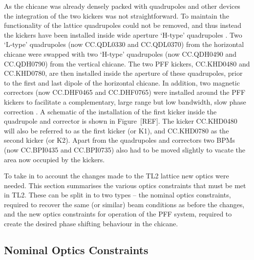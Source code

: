 As the chicane was already densely packed with quadrupoles and other devices the integration of the two kickers was not straightforward. To maintain the functionality of the lattice quadrupoles could not be removed, and thus instead the kickers have been installed inside wide aperture `H-type' quadrupoles \cite{tl2Magnets}. Two `L-type'  quadrupoles \cite{tl2Magnets} (now CC.QDL0330 and CC.QDL0370) from the horizontal chicane were swapped with two `H-type' quadrupoles (now CC.QDH0490 and CC.QDH0790) from the vertical chicane. The two PFF kickers, CC.KHD0480 and CC.KHD0780, are then installed inside the aperture of these quadrupoles, prior to the first and last dipole of the horizontal chicane. In addition, two magnetic correctors (now CC.DHF0465 and CC.DHF0765) were installed around the PFF kickers to facilitate a complementary, large range but low bandwidth, slow phase correction \cite{jackLCWS14}. A schematic of the installation of the first kicker inside the quadrupole and corrector is shown in Figure~[REF]. The kicker CC.KHD0480 will also be referred to as the first kicker (or K1), and CC.KHD0780 as the second kicker (or K2). Apart from the quadrupoles and correctors two BPMs (now CC.BPI0435 and CC.BPI0735) also had to be moved slightly to vacate the area now occupied by the kickers. %


To take in to account the changes made to the TL2 lattice new optics were needed. This section summarises the various optics constraints that must be met in TL2. These can be split in to two types -- the nominal optics constraints, required to recover the same (or similar) beam conditions as before the changes, and the new optics constraints for operation of the PFF system, required to create the desired phase shifting behaviour in the chicane.

\subsection{Nominal Optics Constraints}
\label{ss:nominalOpticsReqs}

